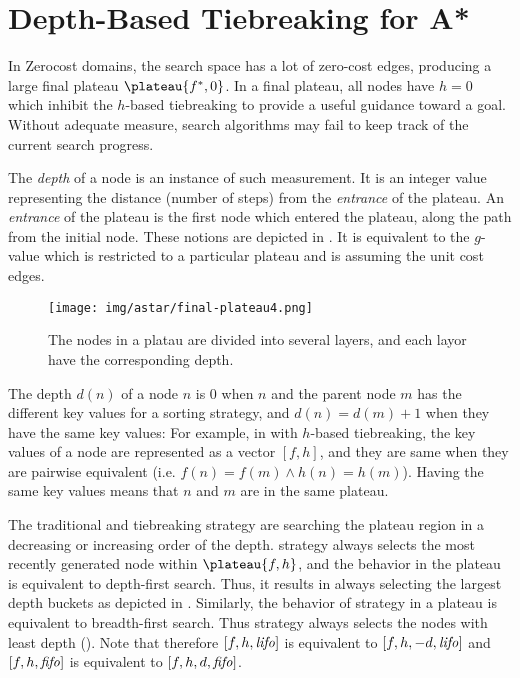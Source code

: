 \section{Depth-Based Tiebreaking for A*}

\label{sec:depth}

In Zerocost domains, the search space has a lot of zero-cost edges,
producing a large final plateau $\plateau{f^*,0}$. In a final plateau,
all nodes have $h=0$ which inhibit the $h$-based tiebreaking to provide
a useful guidance toward a goal. Without adequate measure, search
algorithms may fail to keep track of the current search progress.

The \emph{depth} of a node is an instance of such measurement.  It is an
integer value representing the distance (number of steps) from the
\emph{entrance} of the plateau.  An \emph{entrance} of the plateau is
the first node which entered the plateau, along the path from the
initial node. These notions are depicted in
. It is equivalent to the $g$-value which is
restricted to a particular plateau and is assuming the unit cost edges.

\begin{figure}[htbp]
 \centering
 \texttt{[image: img/astar/final-plateau4.png]}
 \caption{The nodes in a platau are divided into several layers,
 and each layor have the corresponding depth.}
 \label{fig:plateau-depiction}
\end{figure}

The depth $d(n)$ of a
node $n$ is 0 when $n$ and the parent node $m$ has the different key
values for a sorting strategy, and $d(n)=d(m)+1$ when they have the same
key values: For example, in \astar with $h$-based tiebreaking, the key
values of a node are represented as a vector $[f,h]$, and they are same
when they are pairwise equivalent (i.e. $f(n) = f(m) \land h(n) =
h(m)$).  Having the same key values means that $n$ and $m$ are in the
same plateau. 

The traditional \lifo and \fifo tiebreaking strategy are
searching the plateau region in a decreasing or increasing order of the depth.
\lifo strategy always selects the most recently generated node
within $\plateau{f,h}$, and the behavior in the plateau is equivalent to depth-first search.
Thus, it results in always selecting the largest depth
buckets as depicted in .
Similarly, the behavior of \fifo strategy 
in a plateau is equivalent to breadth-first search. Thus \fifo strategy
always selects the nodes with least depth ().
Note that therefore $[f,h,{\text{\textit{lifo}}}]$ is equivalent to $[f,h,-d,{\text{\textit{lifo}}}]$ and
$[f,h,{\text{\textit{fifo}}}]$ is equivalent to $[f,h,d,{\text{\textit{fifo}}}]$.

